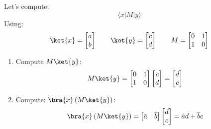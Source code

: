 \begin{itemize}
    \begin{examplebox}
        Let's compute:
        \begin{equation*}
            \langle x | M | y \rangle
        \end{equation*}
        Using:
        \begin{equation*}
            \ket{x} =
            \begin{bmatrix} a \\ b \end{bmatrix} \hspace{2em}
            \ket{y} =
            \begin{bmatrix} c \\ d \end{bmatrix} \hspace{2em}
            M =
            \begin{bmatrix} 0 & 1 \\ 1 & 0 \end{bmatrix}
        \end{equation*}
        \begin{enumerate}
            \item Compute $M \ket{y}$:
            \begin{equation*}
                M \ket{y} =
                \begin{bmatrix} 0 & 1 \\ 1 & 0 \end{bmatrix}
                \begin{bmatrix} c \\ d \end{bmatrix}
                =
                \begin{bmatrix} d \\ c \end{bmatrix}
            \end{equation*}

            \item Compute: $\bra{x} \left(M \ket{y}\right)$:
            \begin{equation*}
                \bra{x} \left(M \ket{y}\right) =
                \begin{bmatrix} \bar{a} & \bar{b} \end{bmatrix}
                \begin{bmatrix} d \\ c \end{bmatrix}
                =
                \bar{a}d + \bar{b}c
            \end{equation*}
        \end{enumerate}
    \end{examplebox}
\end{itemize}